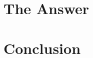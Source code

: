 \documentclass[11pt]{memoir}
\begin{document}
    \newpage
    \section{The Answer}\label{sec:answer}

    \newpage
    \section{Conclusion}\label{sec:conclusion}



\end{document}
